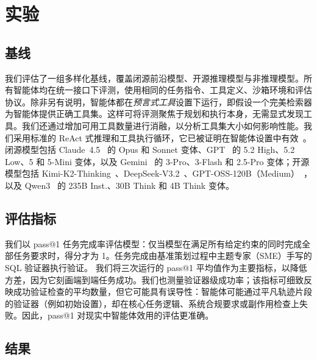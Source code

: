 \section{实验}



\subsection{基线}
\label{subsec:baselines}

我们评估了一组多样化基线，覆盖闭源前沿模型、开源推理模型与非推理模型。所有智能体均在统一接口下评测，使用相同的任务指令、工具定义、沙箱环境和评估协议。除非另有说明，智能体都在\textit{预言式工具}设置下运行，即假设一个完美检索器为智能体提供正确工具集。这样可将评测聚焦于规划和执行本身，无需显式发现工具。我们还通过增加可用工具数量进行消融，以分析工具集大小如何影响性能。我们采用标准的 ReAct 式推理和工具执行循环，它已被证明在智能体设置中有效~\cite{yao2022react}。闭源模型包括 Claude~4.5~\citep{anthropic2025sonnet45, anthropic2025opus45} 的 Opus 和 Sonnet 变体、GPT~\citep{openai2025gpt5} 的 5.2 High、5.2 Low、5 和 5-Mini 变体，以及 Gemini~\citep{comanici2025gemini25pushingfrontier} 的 3-Pro、3-Flash 和 2.5-Pro 变体；开源模型包括 Kimi-K2-Thinking~\citep{kimiteam2025kimik2openagentic}、DeepSeek-V3.2~\citep{deepseekai2024deepseekv3technicalreport}、GPT-OSS-120B（Medium）~\citep{openai2025gptoss120bgptoss20bmodel}，以及 Qwen3~\citep{qwen3} 的 235B Inst.、30B Think 和 4B Think 变体。

\subsection{评估指标}
我们以 pass@1 任务完成率评估模型：仅当模型在满足所有给定约束的同时完成全部任务要求时，得分才为 1。任务完成由基准策划过程中主题专家（SME）手写的 SQL 验证器执行验证。
我们将三次运行的 pass@1 平均值作为主要指标，以降低方差，因为它刻画端到端任务成功。我们也测量验证器级成功率；该指标可细致反映成功验证检查的平均数量，但它可能具有误导性：智能体可能通过平凡轨迹片段的验证器（例如初始设置），却在核心任务逻辑、系统合规要求或副作用检查上失败。因此，pass@1 对现实中智能体效用的评估更准确。

\subsection{结果}

